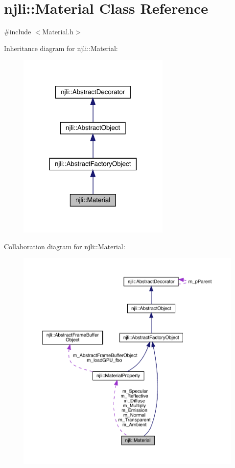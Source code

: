\hypertarget{classnjli_1_1_material}{}\section{njli\+:\+:Material Class Reference}
\label{classnjli_1_1_material}


{\ttfamily \#include $<$Material.\+h$>$}



Inheritance diagram for njli\+:\+:Material\+:\nopagebreak
\begin{figure}[H]
\begin{center}
\leavevmode
\includegraphics[width=213pt]{classnjli_1_1_material__inherit__graph}
\end{center}
\end{figure}


Collaboration diagram for njli\+:\+:Material\+:\nopagebreak
\begin{figure}[H]
\begin{center}
\leavevmode
\includegraphics[width=350pt]{classnjli_1_1_material__coll__graph}
\end{center}
\end{figure}
